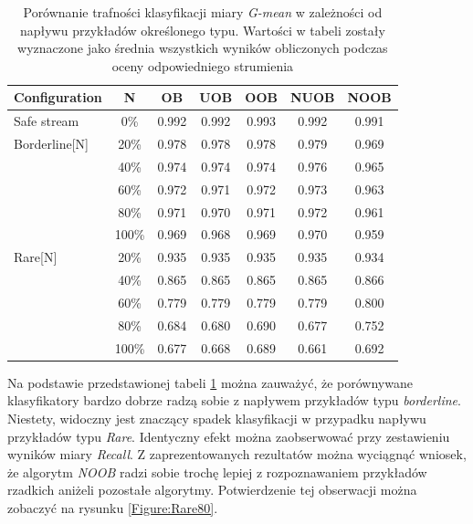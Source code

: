 \begin{table}[ht]
\centering\small%
\renewcommand{\arraystretch}{1.5} 
\begin{tabular}{l c c c c c c}
\toprule
Configuration & N & OB & UOB & OOB & NUOB & NOOB \\
\midrule
Safe stream & 0\% & 0.992 & 0.992 & 0.993 & 0.992 & 0.991 \\
Borderline[N] & 20\% & 0.978 & 0.978 & 0.978 & 0.979 & 0.969 \\
& 40\% & 0.974 & 0.974 & 0.974 & 0.976 & 0.965 \\
& 60\% & 0.972 & 0.971 & 0.972 & 0.973 & 0.963 \\
& 80\% & 0.971 & 0.970 & 0.971 & 0.972 & 0.961 \\
& 100\% & 0.969 & 0.968 & 0.969 & 0.970 & 0.959 \\
Rare[N] & 20\% & 0.935 & 0.935 & 0.935 & 0.935 & 0.934 \\
& 40\% & 0.865 & 0.865 & 0.865 & 0.865 & 0.866 \\
& 60\% & 0.779 & 0.779 & 0.779 & 0.779 & 0.800 \\
& 80\% & 0.684 & 0.680 & 0.690 & 0.677 & 0.752 \\
& 100\% & 0.677 & 0.668 & 0.689 & 0.661 & 0.692 \\
\bottomrule
\end{tabular}
\caption{Porównanie trafności klasyfikacji miary \textit{G-mean} w zależności od napływu przykładów określonego typu. Wartości w tabeli zostały wyznaczone jako średnia wszystkich wyników obliczonych podczas oceny odpowiedniego strumienia}\label{Tab:BorderlineRare}
\end{table}

\noindent Na podstawie przedstawionej tabeli \ref{Tab:BorderlineRare} można zauważyć, że porównywane klasyfikatory bardzo dobrze radzą sobie z napływem przykładów typu \textit{borderline}. Niestety, widoczny jest znaczący spadek klasyfikacji w przypadku napływu przykładów typu \textit{Rare}. Identyczny efekt można zaobserwować przy zestawieniu wyników miary \textit{Recall}. Z zaprezentowanych rezultatów można wyciągnąć wniosek, że algorytm \textit{NOOB} radzi sobie trochę lepiej z rozpoznawaniem przykładów rzadkich aniżeli pozostałe algorytmy. Potwierdzenie tej obserwacji można zobaczyć na rysunku \ref{Figure:Rare80}.

\newpage

